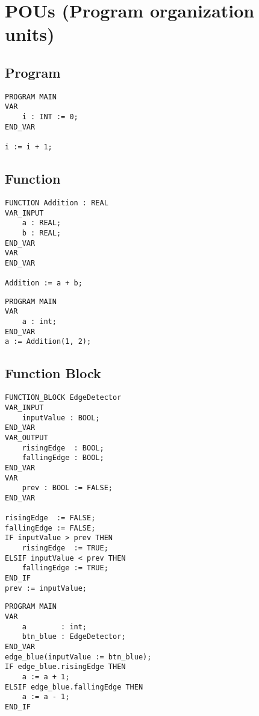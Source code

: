 


\section{POUs (Program organization units)}

\subsection{Program}
\begin{lstlisting}
PROGRAM MAIN
VAR
    i : INT := 0;
END_VAR

i := i + 1;
\end{lstlisting}

\subsection{Function}
\begin{lstlisting}
FUNCTION Addition : REAL
VAR_INPUT
    a : REAL;
    b : REAL;
END_VAR
VAR
END_VAR

Addition := a + b;
\end{lstlisting}

\begin{lstlisting}
PROGRAM MAIN
VAR
    a : int;
END_VAR
a := Addition(1, 2);
\end{lstlisting}

\subsection{Function Block}
\begin{lstlisting}
FUNCTION_BLOCK EdgeDetector
VAR_INPUT
    inputValue : BOOL;
END_VAR
VAR_OUTPUT
    risingEdge  : BOOL;
    fallingEdge : BOOL;
END_VAR
VAR
    prev : BOOL := FALSE;
END_VAR

risingEdge  := FALSE;
fallingEdge := FALSE;
IF inputValue > prev THEN
    risingEdge  := TRUE;
ELSIF inputValue < prev THEN
    fallingEdge := TRUE;
END_IF
prev := inputValue;
\end{lstlisting}

\begin{lstlisting}
PROGRAM MAIN
VAR
    a        : int;
    btn_blue : EdgeDetector;
END_VAR
edge_blue(inputValue := btn_blue);
IF edge_blue.risingEdge THEN
    a := a + 1;
ELSIF edge_blue.fallingEdge THEN
    a := a - 1;
END_IF
\end{lstlisting}
